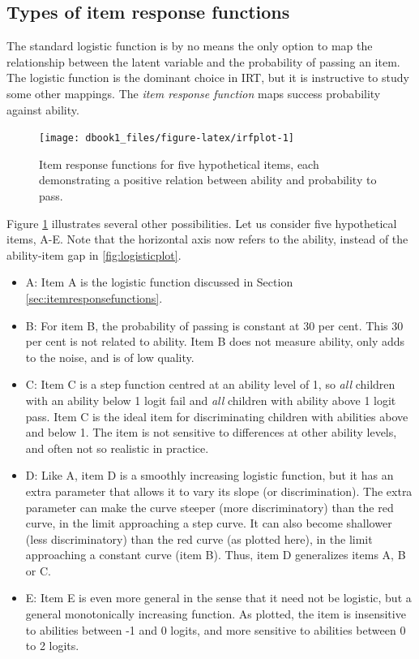 \documentclass[
]{book}
\begin{document}
\hypertarget{types-of-item-response-functions}{%
\subsection{Types of item response functions}\label{types-of-item-response-functions}}

The standard logistic function is by no means the only option to map the relationship between the latent variable and the probability of passing an item. The logistic function is the dominant choice in IRT, but it is instructive to study some other mappings. The \emph{item response function} maps success probability against ability.

\begin{figure}

{\centering \texttt{[image: dbook1\_files/figure-latex/irfplot-1]} 

}

\caption{Item response functions for five hypothetical items, each demonstrating a positive relation between ability and probability to pass.}\label{fig:irfplot}
\end{figure}



Figure \ref{fig:irfplot} illustrates several other possibilities. Let us consider five hypothetical items, A-E. Note that the horizontal axis now refers to the ability, instead of the ability-item gap in \ref{fig:logisticplot}.

\begin{itemize}
\item
  A: Item A is the logistic function discussed in Section \ref{sec:itemresponsefunctions}.
\item
  B: For item B, the probability of passing is constant at 30 per cent. This 30 per cent is not related to ability. Item B does not measure ability, only adds to the noise, and is of low quality.
\item
  C: Item C is a step function centred at an ability level of 1, so \emph{all} children with an ability below 1 logit fail and \emph{all} children with ability above 1 logit pass. Item C is the ideal item for discriminating children with abilities above and below 1. The item is not sensitive to differences at other ability levels, and often not so realistic in practice.
\item
  D: Like A, item D is a smoothly increasing logistic function, but it has an extra parameter that allows it to vary its slope (or discrimination). The extra parameter can make the curve steeper (more discriminatory) than the red curve, in the limit approaching a step curve. It can also become shallower (less discriminatory) than the red curve (as plotted here), in the limit approaching a constant curve (item B). Thus, item D generalizes items A, B or C.
\item
  E: Item E is even more general in the sense that it need not be logistic, but a general monotonically increasing function. As plotted, the item is insensitive to abilities between -1 and 0 logits, and more sensitive to abilities between 0 to 2 logits.
\end{itemize}
\end{document}
